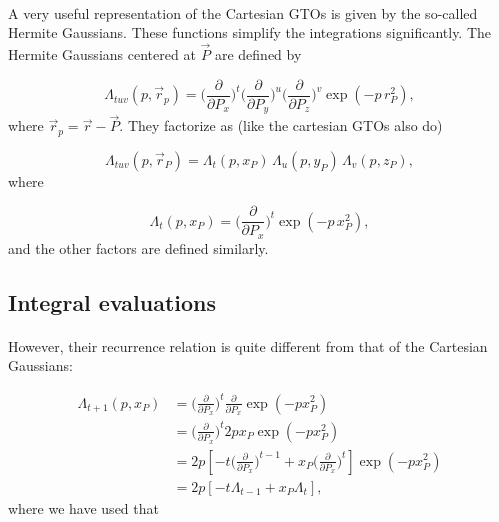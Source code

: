 \documentclass[%
twoside,                 %
final,                   %
10pt]{article}
\begin{document}
\paragraph{}

A very useful representation of the Cartesian GTOs is given by the so-called Hermite Gaussians. These functions simplify 
the integrations significantly. The Hermite Gaussians centered at $\vec P$ are defined by

\begin{equation}
 \Lambda_{tuv}(p, \vec r_p) = \Big(\frac{\partial}{\partial P_x}\Big)^t \Big(\frac{\partial}{\partial P_y}\Big)^u \Big(\frac{\partial}{\partial P_z}\Big)^v \exp(-p\, r^2_P),
\end{equation}
where $\vec r_p = \vec r - \vec P$. They factorize as (like the cartesian GTOs also do)

\begin{equation}
 \Lambda_{tuv}(p, \vec r_P) = \Lambda_t(p,x_P)\,\Lambda_u(p,y_P)\,\Lambda_v(p,z_P),
\end{equation}
where

\begin{equation}
\label{eq:HermiteGaussian_x}
 \Lambda_t(p,x_P) = \Big(\frac{\partial}{\partial P_x}\Big)^t \exp(-p\,x^2_P),
\end{equation}
and the other factors are defined similarly.



\subsection{Integral evaluations}

\paragraph{}

However, their recurrence relation is quite different from that of the Cartesian Gaussians:

\begin{equation}
\begin{split}
 \Lambda_{t+1}(p,x_P) & = \Big(\frac{\partial}{\partial P_x}\Big)^t \frac{\partial}{\partial P_x}\exp(-px^2_P) \\
                      & = \Big(\frac{\partial}{\partial P_x}\Big)^t 2px_P \exp(-px^2_P)  \\
                      & = 2p[-t\Big(\frac{\partial}{\partial P_x}\Big)^{t-1} + x_P \Big(\frac{\partial}{\partial P_x}\Big)^t] \exp(-px^2_P) \\
                      & = 2p[-t\Lambda_{t-1} + x_P \Lambda_t],
\end{split}
\end{equation}
where we have used that
\end{document}
